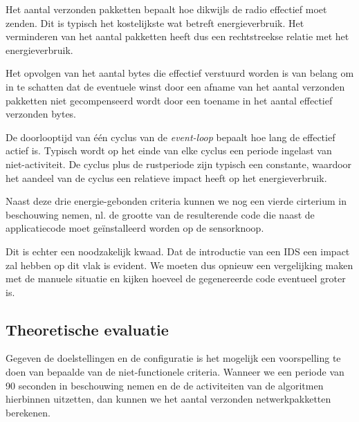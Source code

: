 \begin{description}[noitemsep, topsep=0pt, partopsep=0pt]
  
  \item[Aantal verzonden netwerkpakketten] Het aantal verzonden pakketten
  bepaalt hoe dikwijls de radio effectief moet zenden. Dit is typisch het
  kostelijkste wat betreft energieverbruik. Het verminderen van het aantal
  pakketten heeft dus een rechtstreekse relatie met het energieverbruik.

  \item[Aantal verzonden bytes] Het opvolgen van het aantal bytes die effectief
  verstuurd worden is van belang om in te schatten dat de eventuele winst door
  een afname van het aantal verzonden pakketten niet gecompenseerd wordt door
  een toename in het aantal effectief verzonden bytes.

  \item[Lengte event-loop] De doorlooptijd van \'e\'en cyclus van de
  \emph{event-loop} bepaalt hoe lang de \mcu effectief actief is. Typisch wordt
  op het einde van elke cyclus een periode ingelast van niet-activiteit. De
  cyclus plus de rustperiode zijn typisch een constante, waardoor het aandeel
  van de cyclus een relatieve impact heeft op het energieverbruik.
  
\end{description}

Naast deze drie energie-gebonden criteria kunnen we nog een vierde cirterium in
beschouwing nemen, nl. de grootte van de resulterende code die naast de
applicatiecode moet ge\"installeerd worden op de sensorknoop.

Dit is echter een noodzakelijk kwaad. Dat de introductie van een IDS een impact
zal hebben op dit vlak is evident. We moeten dus opnieuw een vergelijking maken
met de manuele situatie en kijken hoeveel de gegenereerde code eventueel groter
is.

\vspace{-3mm}

\subsection{Theoretische evaluatie}

Gegeven de doelstellingen en de configuratie is het mogelijk een voorspelling
te doen van bepaalde van de niet-functionele criteria. Wanneer we een periode
van 90 seconden in beschouwing nemen en de de activiteiten van de algoritmen
hierbinnen uitzetten, dan kunnen we het aantal verzonden netwerkpakketten
berekenen.

